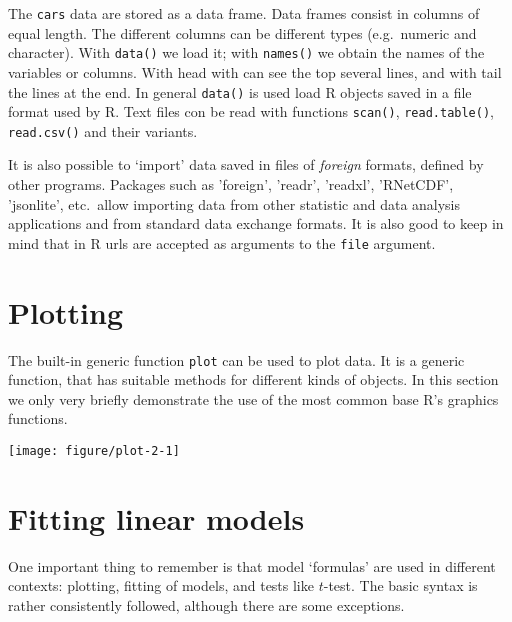 The \texttt{cars} data are stored as a data frame. Data frames consist in columns of equal length. The different columns can be different types (e.g.\ numeric and character). With \texttt{data()} we load it; with \texttt{names()} we obtain the names of the variables or columns. With head with can see the top several lines, and with tail the lines at the end. In general \texttt{data()} is used load R objects saved in a file format used by R. Text files con be read with functions \texttt{scan()}, \texttt{read.table()}, \texttt{read.csv()} and their variants.

It is also possible to `import' data saved in files of \textit{foreign} formats, defined by other programs. Packages such as 'foreign', 'readr', 'readxl', 'RNetCDF', 'jsonlite', etc.\ allow importing data from other statistic and data analysis applications and from standard data exchange formats. It is also good to keep in mind that in R urls are accepted as arguments to the \texttt{file} argument.

\section{Plotting}

The built-in generic function \texttt{plot} can be used to plot data. It is a generic function, that has suitable methods for different kinds of objects. In this section we only very briefly demonstrate the use of the most common base R's graphics functions.

\begin{knitrout}
\color{fgcolor}\begin{kframe}
\begin{alltt}
 \hlopt{~}  
\end{alltt}
\end{kframe}
\texttt{[image: figure/plot-2-1]} 

\end{knitrout}

\section{Fitting linear models}

One important thing to remember is that model `formulas' are used in different contexts: plotting, fitting of models, and tests like $t$-test. The basic syntax is rather consistently followed, although there are some exceptions.

